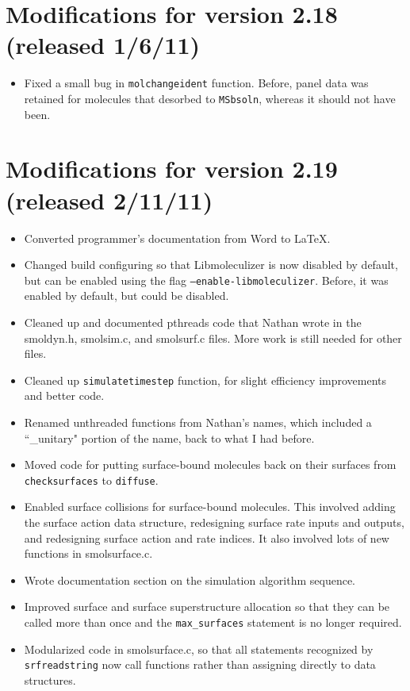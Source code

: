 \documentclass {scrbook}
\newcommand {\ttt} {\texttt}
\begin{document}
\section{Modifications for version 2.18 (released 1/6/11)}
\begin{itemize}
\item Fixed a small bug in \ttt{molchangeident} function. Before, panel data was retained for molecules that desorbed to \ttt{MSbsoln}, whereas it should not have been.
\end{itemize}

\section{Modifications for version 2.19 (released 2/11/11)}
\begin{itemize}
\item Converted programmer's documentation from Word to LaTeX.
\item Changed build configuring so that Libmoleculizer is now disabled by default, but can be enabled using the flag \ttt{--enable-libmoleculizer}. Before, it was enabled by default, but could be disabled.
\item Cleaned up and documented pthreads code that Nathan wrote in the smoldyn.h, smolsim.c, and smolsurf.c files. More work is still needed for other files.
\item Cleaned up \ttt{simulatetimestep} function, for slight efficiency improvements and better code.
\item Renamed unthreaded functions from Nathan's names, which included a ``\_unitary" portion of the name, back to what I had before.
\item Moved code for putting surface-bound molecules back on their surfaces from \ttt{checksurfaces} to \ttt{diffuse}.
\item Enabled surface collisions for surface-bound molecules. This involved adding the surface action data structure, redesigning surface rate inputs and outputs, and redesigning surface action and rate indices. It also involved lots of new functions in smolsurface.c.
\item Wrote documentation section on the simulation algorithm sequence.
\item Improved surface and surface superstructure allocation so that they can be called more than once and the \ttt{max\_surfaces} statement is no longer required.
\item Modularized code in smolsurface.c, so that all statements recognized by \ttt{srfreadstring} now call functions rather than assigning directly to data structures.

\end{itemize}
\end{document}
